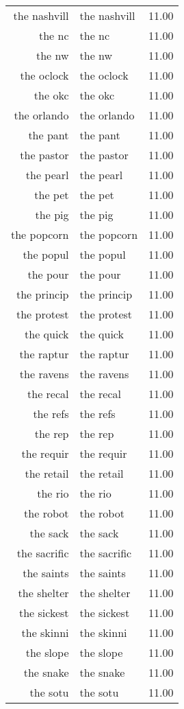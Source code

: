 \begin{table}[ht]
\begin{tabular}{rlr}
  the nashvill & the nashvill & 11.00 \\ 
  the nc & the nc & 11.00 \\ 
  the nw & the nw & 11.00 \\ 
  the oclock & the oclock & 11.00 \\ 
  the okc & the okc & 11.00 \\ 
  the orlando & the orlando & 11.00 \\ 
  the pant & the pant & 11.00 \\ 
  the pastor & the pastor & 11.00 \\ 
  the pearl & the pearl & 11.00 \\ 
  the pet & the pet & 11.00 \\ 
  the pig & the pig & 11.00 \\ 
  the popcorn & the popcorn & 11.00 \\ 
  the popul & the popul & 11.00 \\ 
  the pour & the pour & 11.00 \\ 
  the princip & the princip & 11.00 \\ 
  the protest & the protest & 11.00 \\ 
  the quick & the quick & 11.00 \\ 
  the raptur & the raptur & 11.00 \\ 
  the ravens & the ravens & 11.00 \\ 
  the recal & the recal & 11.00 \\ 
  the refs & the refs & 11.00 \\ 
  the rep & the rep & 11.00 \\ 
  the requir & the requir & 11.00 \\ 
  the retail & the retail & 11.00 \\ 
  the rio & the rio & 11.00 \\ 
  the robot & the robot & 11.00 \\ 
  the sack & the sack & 11.00 \\ 
  the sacrific & the sacrific & 11.00 \\ 
  the saints & the saints & 11.00 \\ 
  the shelter & the shelter & 11.00 \\ 
  the sickest & the sickest & 11.00 \\ 
  the skinni & the skinni & 11.00 \\ 
  the slope & the slope & 11.00 \\ 
  the snake & the snake & 11.00 \\ 
  the sotu & the sotu & 11.00 \\ 

\end{tabular}
\end{table}
